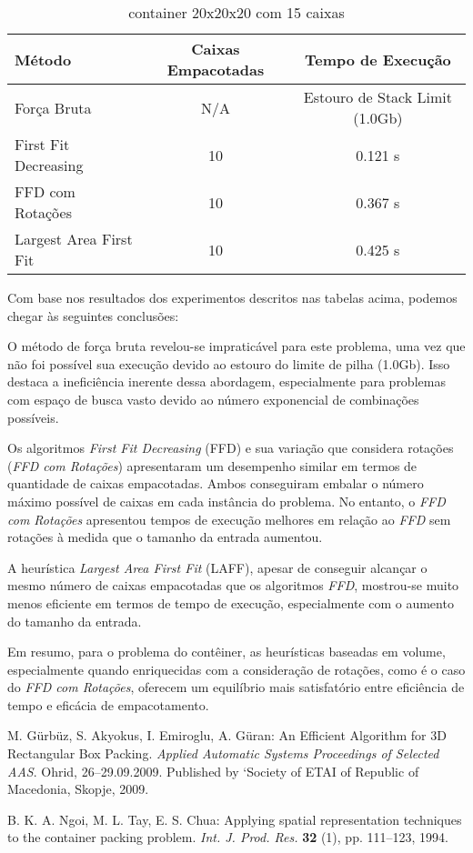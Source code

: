 \documentclass[12pt]{article}
\begin{document}
\begin{table}[H]
	\centering
	\caption{container 20x20x20 com 15 caixas}
	\begin{tabular}{lcc}
		\toprule
		\textbf{Método}        & \textbf{Caixas Empacotadas} & \textbf{Tempo de Execução}     \\
		\midrule
		Força Bruta            & N/A                         & Estouro de Stack Limit (1.0Gb) \\
		First Fit Decreasing   & 10                          & 0.121 s                        \\
		FFD com Rotações       & 10                          & 0.367 s                        \\
		Largest Area First Fit & 10                          & 0.425 s                        \\
		\bottomrule
	\end{tabular}
	\label{tab:resultados_20}
\end{table}

Com base nos resultados dos experimentos descritos nas tabelas acima, podemos chegar às seguintes conclusões:

O método de força bruta revelou-se impraticável para este problema, uma vez que não foi possível sua execução devido ao estouro do limite de pilha (1.0Gb). Isso destaca a ineficiência inerente dessa abordagem, especialmente para problemas com espaço de busca vasto devido ao número exponencial de combinações possíveis.

Os algoritmos \emph{First Fit Decreasing} (FFD) e sua variação que considera rotações (\emph{FFD com Rotações}) apresentaram um desempenho similar em termos de quantidade de caixas empacotadas. Ambos conseguiram embalar o número máximo possível de caixas em cada instância do problema. No entanto, o \emph{FFD com Rotações} apresentou tempos de execução melhores em relação ao \emph{FFD} sem rotações à medida que o tamanho da entrada aumentou.

A heurística \emph{Largest Area First Fit} (LAFF), apesar de conseguir alcançar o mesmo número de caixas empacotadas que os algoritmos \emph{FFD}, mostrou-se muito menos eficiente em termos de tempo de execução, especialmente com o aumento do tamanho da entrada.

Em resumo, para o problema do contêiner, as heurísticas baseadas em volume, especialmente quando enriquecidas com a consideração de rotações, como é o caso do \emph{FFD com Rotações}, oferecem um equilíbrio mais satisfatório entre eficiência de tempo e eficácia de empacotamento.

\begin{thebibliography}{99}

	 M. G\"{u}rb\"{u}z, S. Akyokus, I. Emiroglu, A. G\"{u}ran: An Efficient Algorithm for 3D Rectangular Box Packing. \emph{Applied Automatic Systems Proceedings of Selected AAS}. Ohrid, 26--29.09.2009. Published by `Society of ETAI of Republic of Macedonia, Skopje, 2009.

	 B. K. A. Ngoi, M. L. Tay, E. S. Chua: Applying spatial representation techniques to the container packing problem. \emph{Int. J. Prod. Res.} \textbf{32} (1), pp. 111--123, 1994.

\end{thebibliography}
\end{document}
